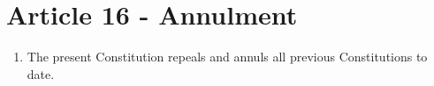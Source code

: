\section{Article 16 - Annulment}
\label{article-16-annulment}

\begin{enumerate}
 \item The present Constitution repeals and annuls all previous Constitutions to date.
\end{enumerate}
